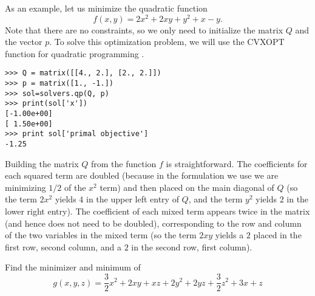 As an example, let us minimize the quadratic function
\[
f(x,y) = 2x^2 +2xy + y^2 +x -y.
\]
Note that there are no constraints, so we only need to initialize the matrix $Q$ and the vector $p$.
To solve this optimization problem, we will use the CVXOPT function for quadratic programming .
\begin{lstlisting}
>>> Q = matrix([[4., 2.], [2., 2.]])
>>> p = matrix([1., -1.])
>>> sol=solvers.qp(Q, p)
>>> print(sol['x'])
[-1.00e+00]
[ 1.50e+00]
>>> print sol['primal objective']
-1.25
\end{lstlisting}
Building the matrix $Q$ from the function $f$ is straightforward. The coefficients for each squared term are doubled (because in the formulation we use we are minimizing $1/2$ of the $x^2$ term) and then placed on the main diagonal of $Q$ (so the term $2x^2$ yields $4$ in the upper left entry of
$Q$, and the term $y^2$ yields $2$ in the lower right entry).
The coefficient of each mixed term appears twice in the matrix (and hence does not need to be doubled), corresponding to the row and column of the two variables in the mixed term (so the term $2xy$ yields a $2$ placed in the first row, second column, and a $2$ in
the second row, first column). 

\begin{problem}
Find the minimizer and minimum of
\begin{equation*}
g(x,y,z) = \frac{3}{2}x^2 +2xy + xz+ 2y^2 +2yz+\frac{3}{2}z^2+3x + z
\end{equation*}
\begin{comment}
\begin{equation}
f(x) = \frac{1}{2}x^TQx - x^Tp
\end{equation}
where

\begin{center}
$Q =
\begin{bmatrix}
3 & 2 & 1\\
2 & 4 & 2\\
1 & 2 & 3\\
\end{bmatrix}
$
and $p =
\begin{bmatrix}
3\\
0\\
1\\
\end{bmatrix}
$
\end{center}
\end{comment}

\end{problem}


